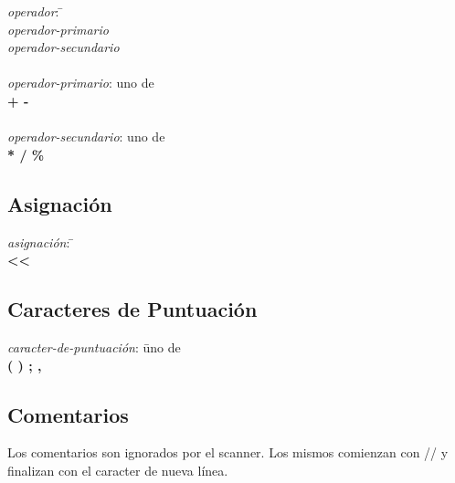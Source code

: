\begin{tabbing}

\textit{operador}: \= \+ \\
    \textit{operador-primario} \\
    \textit{operador-secundario} \\

\- \\ \textit{operador-primario}: uno de \+ \\
    \textbf{
        +
        \hspace{3pt}
        -
    }\\

\- \\ \textit{operador-secundario}: uno de \+ \\
    \textbf{
        *
        \hspace{3pt}
        /
        \hspace{3pt}
        \%
    }

\end{tabbing}

\subsection{Asignación}

\begin{tabbing}

\textit{asignación}: \= \+ \\
    \textbf{<}\textbf{<}

\end{tabbing}

\subsection{Caracteres de Puntuación}

\begin{tabbing}

\textit{caracter-de-puntuación}: \= uno de \+ \\
    \textbf{
        (
        \hspace{3pt}
        )
        \hspace{3pt}
        ;
        \hspace{3pt}
        ,
    }

\end{tabbing}

\subsection{Comentarios}

Los comentarios son ignorados por el scanner. Los mismos comienzan con // y finalizan con el caracter de nueva línea.
